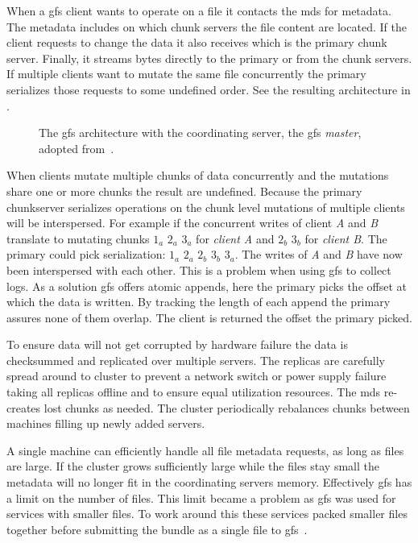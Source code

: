 When a \ac{gfs} client wants to operate on a file it contacts the \ac{mds} for metadata. The metadata includes on which chunk servers the file content are located. If the client requests to change the data it also receives which is the primary chunk server. Finally, it streams bytes directly to the primary or from the chunk servers. If multiple clients want to mutate the same file concurrently the primary serializes those requests to some undefined order. See the resulting architecture in .
%
\begin{figure}[htbp]
	\centering
	
	\caption{The \ac{gfs} architecture with the coordinating server, the \ac{gfs} \textit{master}, adopted from~\cite{GFS}.}
	\label{fig:GFS_arch}
\end{figure}
%
When clients mutate multiple chunks of data concurrently and the mutations share one or more chunks the result are undefined. Because the primary chunkserver serializes operations on the chunk level mutations of multiple clients will be interspersed. For example if the concurrent writes of client \textit{A} and \textit{B} translate to mutating chunks $1_a$ $2_a$ $3_a$ for \textit{client A} and $2_b$ $3_b$ for \textit{client B}. The primary could pick serialization: $1_a$ $2_a$ $2_b$ $3_b$ $3_a$. The writes of \textit{A} and \textit{B} have now been interspersed with each other. This is a problem when using \ac{gfs} to collect logs. As a solution \ac{gfs} offers atomic appends, here the primary picks the offset at which the data is written. By tracking the length of each append the primary assures none of them overlap. The client is returned the offset the primary picked.

To ensure data will not get corrupted by hardware failure the data is checksummed and replicated over multiple servers. The replicas are carefully spread around to cluster to prevent a network switch or power supply failure taking all replicas offline and to ensure equal utilization resources. The \ac{mds} re-creates lost chunks as needed. The cluster periodically rebalances chunks between machines filling up newly added servers. 

A single machine can efficiently handle all file metadata requests, as long as files are large. If the cluster grows sufficiently large while the files stay small the metadata will no longer fit in the coordinating servers memory. Effectively \ac{gfs} has a limit on the number of files. This limit became a problem as \ac{gfs} was used for services with smaller files. To work around this these services packed smaller files together before submitting the bundle as a single file to \ac{gfs}~\cite{GFS_interview}.

